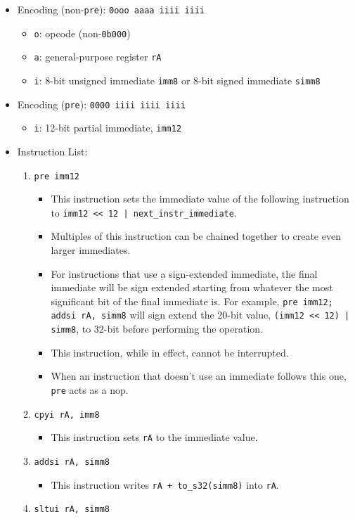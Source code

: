 \documentclass{article}
\begin{document}
		\begin{itemize}
		\item Encoding (non-\texttt{pre}):  \texttt{0ooo aaaa iiii iiii}
			\begin{itemize}
			\item \texttt{o}:  opcode (non-\texttt{0b000})
			\item \texttt{a}:  general-purpose register \texttt{rA}
			\item \texttt{i}:  8-bit unsigned immediate \texttt{imm8} or
				8-bit signed immediate \texttt{simm8}
			\end{itemize}
		\item Encoding (\texttt{pre}):  \texttt{0000 iiii iiii iiii}
			\begin{itemize}
			\item \texttt{i}:  12-bit partial immediate, \texttt{imm12}
			\end{itemize}
		\item Instruction List:
			\begin{enumerate}
			\item \texttt{pre imm12}
				\begin{itemize}
				\item This instruction sets the immediate value of the
					following instruction to
					\texttt{{imm12 << 12} | next\_instr\_immediate}.
				\item Multiples of this instruction can be chained together
					to create even larger immediates.
				\item For instructions that use a sign-extended immediate,
					the final immediate will be sign extended starting from
					whatever the most significant bit of the final
					immediate is.  For example,
					\texttt{pre imm12; addsi rA, simm8}
					will sign extend the 20-bit value,
					\texttt{(imm12 << 12) | simm8}, to 32-bit before
					performing the operation.
				\item This instruction, while in effect, cannot be
					interrupted.
				\item When an instruction that doesn't use an immediate
					follows this one, \texttt{pre} acts as a nop.
				\end{itemize}
			\item \texttt{cpyi rA, imm8}
				\begin{itemize}
				\item This instruction sets \texttt{rA} to the immediate
					value.
				\end{itemize}
			\item \texttt{addsi rA, simm8}
				\begin{itemize}
				\item This instruction writes \texttt{rA + to\_s32(simm8)}
					into \texttt{rA}.
				\end{itemize}
			\item \texttt{sltui rA, simm8}


\end{enumerate}
\end{itemize}
\end{document}
